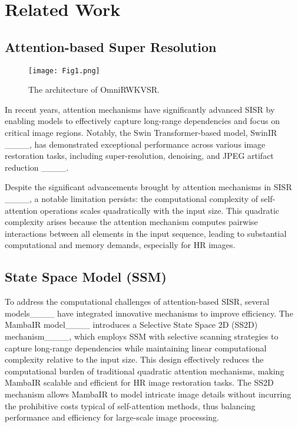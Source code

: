 \section{Related Work}
\subsection{Attention-based Super Resolution}
\begin{figure*}[!t]
    \centering
    \texttt{[image: Fig1.png]}
    \caption{The architecture of OmniRWKVSR.}
    \label{arch}
\end{figure*}

In recent years, attention mechanisms have significantly advanced SISR by enabling models to effectively capture long-range dependencies and focus on critical image regions. Notably, the Swin Transformer-based model, SwinIR ____, has demonstrated exceptional performance across various image restoration tasks, including super-resolution, denoising, and JPEG artifact reduction ____.


Despite the significant advancements brought by attention mechanisms in SISR ____, a notable limitation persists: the computational complexity of self-attention operations scales quadratically with the input size. This quadratic complexity arises because the attention mechanism computes pairwise interactions between all elements in the input sequence, leading to substantial computational and memory demands, especially for HR images. 

\subsection{State Space Model (SSM)}

To address the computational challenges of attention-based SISR, several models____ have integrated innovative mechanisms to improve efficiency. The MambaIR model____ introduces a Selective State Space 2D (SS2D) mechanism____, which employs SSM with selective scanning strategies to capture long-range dependencies while maintaining linear computational complexity relative to the input size. This design effectively reduces the computational burden of traditional quadratic attention mechanisms, making MambaIR scalable and efficient for HR image restoration tasks. The SS2D mechanism allows MambaIR to model intricate image details without incurring the prohibitive costs typical of self-attention methods, thus balancing performance and efficiency for large-scale image processing.

